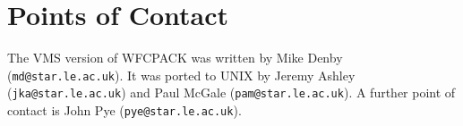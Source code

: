 \section{Points of Contact}
\label{sec:contact}

The VMS version of WFCPACK was written by Mike Denby ({\tt md@star.le.ac.uk}).
It was ported to UNIX by Jeremy Ashley ({\tt jka@star.le.ac.uk}) and Paul
McGale ({\tt pam@star.le.ac.uk}).  A further point of contact is John Pye
({\tt pye@star.le.ac.uk}).


